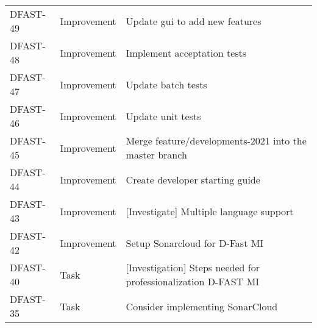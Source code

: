 \documentclass[git]{deltares_manual}
\begin{document}
\begin{longtable}{l|l|p{8cm}}
DFAST-49 & Improvement & Update gui to add new features \\
DFAST-48 & Improvement & Implement acceptation tests \\
DFAST-47 & Improvement & Update batch tests \\
DFAST-46 & Improvement & Update unit tests \\
DFAST-45 & Improvement & Merge feature/developments-2021 into the master branch \\
DFAST-44 & Improvement & Create developer starting guide \\
DFAST-43 & Improvement & [Investigate] Multiple language support \\
DFAST-42 & Improvement & Setup Sonarcloud for D-Fast MI \\
DFAST-40 & Task & [Investigation] Steps needed for professionalization D-FAST MI \\
DFAST-35 & Task & Consider implementing SonarCloud  \\
\end{longtable}

\pagestyle{empty}
\cleardoublepage
\mbox{}
\end{document}
